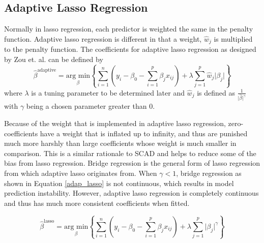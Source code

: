 \documentclass{article}
\newcommand{\argmin}[1]{\underset{\beta}{\text{arg min}}}
\begin{document}
\subsection{Adaptive Lasso Regression}
Normally in lasso regression, each predictor is weighted the same in the penalty function. Adaptive lasso regression is different in that a weight, $\hat{w}_j$ is multiplied to the penalty function. The coefficients for adaptive lasso regression as designed by Zou et. al. \cite{zou2006adaptive} can be defined by
\begin{equation}
	\hat{\beta}^{\text{adaptive}}=\argmin{\beta}\left\{ \sum\limits_{i = 1}^n \left( y_i - \beta_0 - \sum\limits_{i = 1}^p \beta_j x_{ij} \right) + \lambda\sum\limits_{j = 1}^p \hat{w}_j\vert \beta_j \vert \right\}
\end{equation}
where $\lambda$ is a tuning parameter to be determined later and $\hat{w}_j$ is defined as $\frac{1}{\vert\hat{\beta}\vert^{\gamma}}$ with $\gamma$ being a chosen parameter greater than 0.

Because of the weight that is implemented in adaptive lasso regression, zero-coefficients have a weight that is inflated up to infinity, and thus are punished much more harshly than large coefficients whose weight is much smaller in comparison. This is a similar rationale to SCAD and helps to reduce some of the bias from lasso regression. Bridge regression is the general form of lasso regression from which adaptive lasso originates from. When $\gamma < 1$, bridge regression as shown in Equation \ref{adap_lasso} is not continuous, which results in model prediction instability. However, adaptive lasso regression is completely continuous and thus has much more consistent coefficients when fitted.

\begin{equation}
	\hat{\beta}^{\text{lasso}}=\argmin{\beta}\left\{ \sum\limits_{i = 1}^n \left( y_i - \beta_0 - \sum\limits_{i = 1}^p \beta_j x_{ij} \right) + \lambda\sum\limits_{j = 1}^p \vert \beta_j \vert ^\gamma \right\}
	\label{adap_lasso}
\end{equation}
\end{document}
